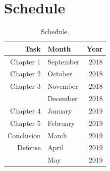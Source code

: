 \documentclass[12pt,twoside,a4paper]{book}
\numberwithin{equation}{section}
\theoremstyle{remark}
\begin{document}
\chapter{Schedule}

\begin{table}[h]
\centering

\begin{tabular}{|r|lr|}
\hline
Task & Month&Year \\ 
\hline                               
Chapter 1& September & 2018 \\
Chapter 2 &October & 2018 \\
Chapter 3&November & 2018 \\
 &December & 2018 \\
Chapter 4&January & 2019 \\
Chapter 5&February & 2019 \\
Conclusion&March & 2019 \\
Defense&April & 2019 \\
 &May & 2019   \\ 
\hline
\end{tabular}
\caption{Schedule.}
\label{tab:schedule}
\end{table}
\end{document}

